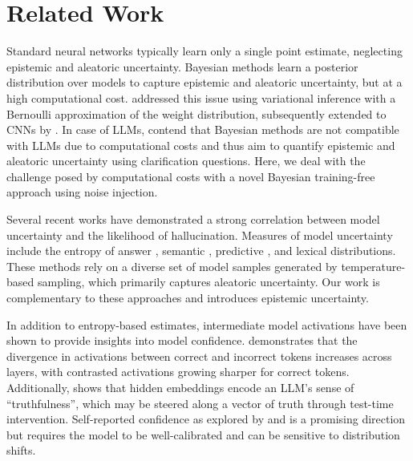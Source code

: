 \section{Related Work}
 Standard neural networks typically learn only a single point estimate, neglecting epistemic and aleatoric uncertainty. Bayesian methods \citep{mackay1992practical,neal2012bayesian} learn a posterior distribution over models to capture epistemic and aleatoric uncertainty, but at a high computational cost. \citet{gal2016dropout} addressed this issue using variational inference with a Bernoulli approximation of the weight distribution, subsequently extended to CNNs by \citet{Gal2016Bayesian}. In case of LLMs, \citet{HouLQAC024} contend that Bayesian methods are not compatible with LLMs due to computational costs and thus aim to quantify epistemic and aleatoric uncertainty using clarification questions. Here, we deal with the challenge posed by computational costs with a novel Bayesian training-free approach using noise injection.


Several recent works have demonstrated a strong correlation between model uncertainty and the likelihood of hallucination. Measures of model uncertainty include  the entropy of answer \citep{malinin2021uncertainty}, semantic \citep{kuhn2023semantic, chen2024inside, farquhar2024detecting}, predictive \citep{xiao2021hallucination}, and lexical \citep{lin2022towards, lin2023generating} distributions. These methods rely on a diverse set of model samples generated by temperature-based sampling, which primarily captures aleatoric uncertainty. Our work is complementary to these approaches and introduces epistemic uncertainty.

In addition to entropy-based estimates, intermediate model activations have been shown to provide insights into model confidence. \citet{chuang2023dola} demonstrates that the divergence in activations between correct and incorrect tokens increases across layers, with contrasted activations growing sharper for correct tokens. 
Additionally, \citet{li2024inference} shows that hidden embeddings encode an LLM's sense of ``truthfulness'', which may be steered along a vector of truth through test-time intervention. 
Self-reported confidence as explored by \citet{manakul-etal-2023-selfcheckgpt} and \citet{kadavath2022language} is a promising direction but requires the model to be well-calibrated and can be sensitive to distribution shifts. %